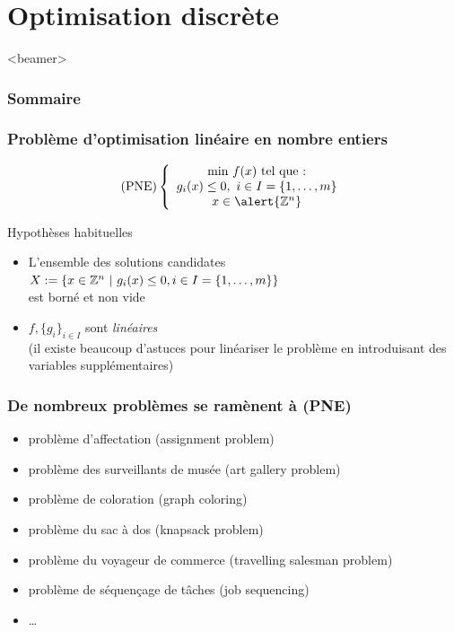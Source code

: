\documentclass{beamer}
\newcommand{\Z}{{\ensuremath\mathbb{Z}}}
\begin{document}
\section{Optimisation discrète}

\begin{frame}<beamer>
  \frametitle{Sommaire}
  \tableofcontents[currentsection]
\end{frame}

\begin{frame}
  \frametitle{Problème d'optimisation linéaire en nombre entiers}
  
  \[
  \text{(PNE)} \left\{
  \begin{array}{c}
    \text{min} \ f(x) \ \text{tel que :} \\
    g_i(x) \leq 0, \ i \in I = \{1, \dots, m\} \\
    x \in \alert{\Z^n}
  \end{array}
  \right.
  \]

  \begin{block}{Hypothèses habituelles}
    \begin{itemize}
    \item L'ensemble des solutions candidates
      $X := \{ x \in \Z^n \ | \ g_i(x) \leq 0, i \in I = \{1, \dots, m\} \}$ \\
      est borné et non vide
    \item $f, \{g_i\}_{i \in I}$ sont \emph{linéaires} \\
      (il existe beaucoup d'astuces pour
      linéariser le problème en introduisant des variables supplémentaires)
    \end{itemize}
  \end{block}
\end{frame}

\begin{frame}
  \frametitle{De nombreux problèmes se ramènent à (PNE)}

  \begin{itemize}
    \item problème d'affectation (assignment problem)
    \item problème des surveillants de musée (art gallery problem)
    \item problème de coloration (graph coloring)
    \item problème du sac à dos (knapsack problem)
    \item problème du voyageur de commerce (travelling salesman problem)
    \item problème de séquençage de tâches (job sequencing)
    \item \dots
  \end{itemize}
  
\end{frame}
\end{document}
